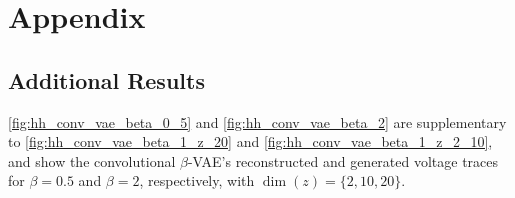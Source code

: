 \section{Appendix}\label{sec:Appendix A}

\subsection{Additional Results}\label{app:additional_results}



\autoref{fig:hh_conv_vae_beta_0_5} and \autoref{fig:hh_conv_vae_beta_2} are supplementary to \autoref{fig:hh_conv_vae_beta_1_z_20} and \autoref{fig:hh_conv_vae_beta_1_z_2_10}, and show the convolutional $\beta$-VAE's reconstructed and generated voltage traces for $\beta = 0.5$ and $\beta=2$, respectively, with $\dim (z) = \{2, 10, 20\}$.


